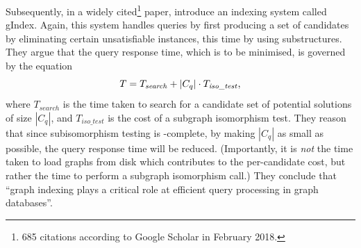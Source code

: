 \documentclass[twoside,11pt]{article}
\begin{document}
Subsequently, in a widely cited\footnote{685 citations according to Google Scholar in February
2018.} paper,  introduce an indexing system
called gIndex. Again, this system handles queries by first producing a set of candidates by
eliminating certain unsatisfiable instances, this time by using substructures. They argue that the
query response time, which is to be minimised, is governed by the equation \[ T =
T_{\mathit{search}} + \left|C_q\right| \cdot T_{\mathit{iso\_test}} \textnormal{,}\] where
$T_{\mathit{search}}$ is the time taken to search for a candidate set of potential solutions of size
$\left|C_q\right|$, and $T_{\mathit{iso\_test}}$ is the cost of a subgraph isomorphism test. They
reason that since subisomorphism testing is \NP-complete, by making $\left|C_q\right|$ as small as
possible, the query response time will be reduced.  (Importantly, it is \emph{not} the time taken to
load graphs from disk which contributes to the per-candidate cost, but rather the time to perform a
subgraph isomorphism call.) They conclude that ``graph indexing plays a critical role at efficient
query processing in graph databases''.
\end{document}
